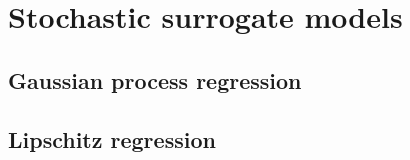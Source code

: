 \section{Stochastic surrogate models}\label{sec:surrogates}
\subsection{Gaussian process regression}\label{sec:GPR}
\lipsum
\subsection{Lipschitz regression}\label{sec:LR}